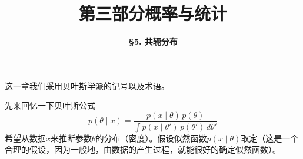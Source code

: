 



\title[Probability \& Statistics]{\LARGE \bfseries 第三部分\quad 概率与统计} %
\author[Conjugate Distributions] %
{\Large \bfseries \S 5. 共轭分布}
\date{}






\begin{frame}

\titlepage %

\end{frame}






\begin{frame}

这一章我们采用贝叶斯学派的记号以及术语。

\vspace{0.5em}

先来回忆一下贝叶斯公式
\[p(\theta \mid x)={\dfrac{p(x \mid \theta)\, p(\theta)}{ \int p(x \mid \theta')\,p(\theta')\,d\theta '}}\]
希望从数据$x$来推断参数$\theta$的分布（密度）。假设似然函数$p(x \mid \theta)$取定（这是一个合理的假设，因为一般地，由数据的产生过程，就能很好的确定似然函数）。

\end{frame}


